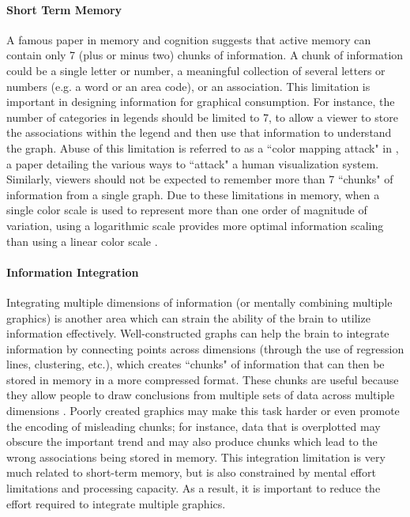 \documentclass[11pt]{isuthesis}\usepackage[]{graphicx}\usepackage[]{color}
\begin{document}
\paragraph{Short Term Memory} A famous paper in memory and cognition \citep{miller1956magical} suggests that active memory can contain only 7 (plus or minus two) chunks of information. A chunk of information could be a single letter or number, a meaningful collection of several letters or numbers (e.g. a word or an area code), or an association. This limitation is important in designing information for graphical consumption. For instance,  the number of categories in legends should be limited to 7, to allow a viewer to store the associations within the legend and then use that information to understand the graph. Abuse of this limitation is referred to as a ``color mapping attack" in \citet{conti2005attacking}, a paper detailing the various ways to ``attack" a human visualization system. Similarly, viewers should not be expected to remember more than 7 ``chunks" of information from a single graph. Due to these limitations in memory, when a single color scale is used to represent more than one order of magnitude of variation, using a logarithmic scale provides more optimal information scaling than using a linear color scale \citep{sun2012framework, varshney2013we}. 

\paragraph{Information Integration}
Integrating multiple dimensions of information (or mentally combining multiple graphics) is another area which can strain the ability of the brain to utilize information effectively. Well-constructed graphs can help the brain to integrate information by connecting points across dimensions (through the use of regression lines, clustering, etc.), which creates ``chunks" of information that can then be stored in memory in a more compressed format. These chunks are useful because they allow people to draw conclusions from multiple sets of data across multiple dimensions \citep{gattis1996mapping}. Poorly created graphics may make this task harder or even promote the encoding of misleading chunks; for instance, data that is overplotted may obscure the important trend and may also produce chunks which lead to the wrong associations being stored in memory. This integration limitation is very much related to short-term memory, but is also constrained by mental effort limitations and processing capacity. As a result, it is important to reduce the effort required to integrate multiple graphics. 
\end{document}
